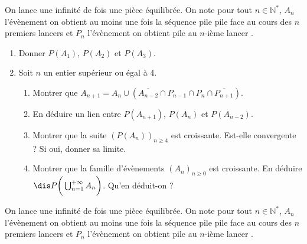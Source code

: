 \documentclass[a4paper,10pt]{report}
\begin{document}
\begin{Exa} On lance une infinité de fois une pièce équilibrée. On note pour tout $n \in \mathbb{N}^*$, $A_n$ l'évènement \og on obtient au moins une fois la séquence pile pile face au cours des $n$ premiers lancers \fg et $P_n$  l'évènement \og on obtient pile au $n$-ième lancer \fg .

\begin{enumerate}
\item Donner $P(A_1)$, $P(A_2)$ et $P(A_3)$.
\item Soit $n$ un entier supérieur ou égal à 4.
\begin{enumerate}
\item Montrer que $A_{n+1} = A_n  \cup (\overline{A_{n-2}} \cap P_{n-1} \cap P_n \cap \overline{P_{n+1}})$.
\item En déduire un lien entre $P(A_{n+1})$, $P(A_n)$ et $P(A_{n-2})$. 
\item Montrer que la suite $(P(A_n))_{n \geq 4}$ est croissante. Est-elle convergente ? Si oui, donner sa limite.
\item Montrer que la famille d'évènements $(A_n)_{n \geq 0}$ est croissante. En déduire $\dis P \bigg{(} \bigcup_{n=1}^{+  \infty} A_n \bigg{)}$. Qu'en déduit-on ?
\end{enumerate}
\end{enumerate}
\end{Exa}

\corr On lance une infinité de fois une pièce équilibrée. On note pour tout $n \in \mathbb{N}^*$, $A_n$ l'évènement \og on obtient au moins une fois la séquence pile pile face au cours des $n$ premiers lancers \fg et $P_n$  l'évènement \og on obtient pile au $n$-ième lancer \fg .
\end{document}
